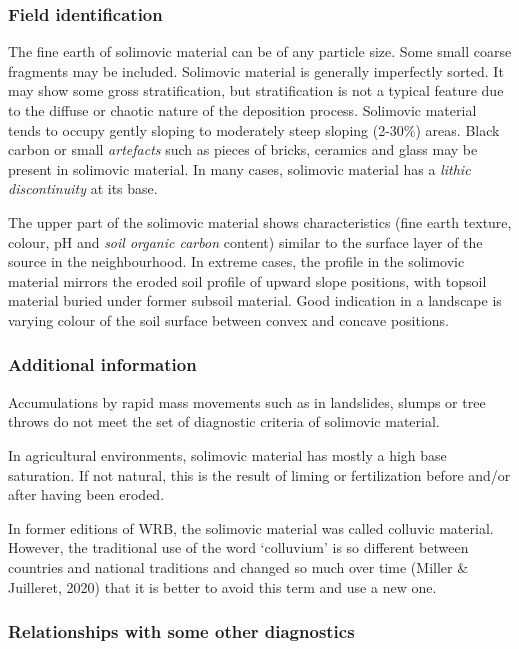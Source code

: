 \documentclass[
  letterpaper,
  DIV=11,
  numbers=noendperiod]{scrreprt}
\begin{document}
\hypertarget{field-identification-46}{%
\subsubsection{Field identification}\label{field-identification-46}}

The fine earth of solimovic material can be of any particle size. Some
small coarse fragments may be included. Solimovic material is generally
imperfectly sorted. It may show some gross stratification, but
stratification is not a typical feature due to the diffuse or chaotic
nature of the deposition process. Solimovic material tends to occupy
gently sloping to moderately steep sloping (2-30\%) areas. Black carbon
or small \emph{artefacts} such as pieces of bricks, ceramics and glass
may be present in solimovic material. In many cases, solimovic material
has a \emph{lithic discontinuity} at its base.

The upper part of the solimovic material shows characteristics (fine
earth texture, colour, pH and \emph{soil organic carbon} content)
similar to the surface layer of the source in the neighbourhood. In
extreme cases, the profile in the solimovic material mirrors the eroded
soil profile of upward slope positions, with topsoil material buried
under former subsoil material. Good indication in a landscape is varying
colour of the soil surface between convex and concave positions.

\hypertarget{additional-information-34}{%
\subsubsection{Additional information}\label{additional-information-34}}

Accumulations by rapid mass movements such as in landslides, slumps or
tree throws do not meet the set of diagnostic criteria of solimovic
material.

In agricultural environments, solimovic material has mostly a high base
saturation. If not natural, this is the result of liming or
fertilization before and/or after having been eroded.

In former editions of WRB, the solimovic material was called colluvic
material. However, the traditional use of the word `colluvium' is so
different between countries and national traditions and changed so much
over time (Miller \& Juilleret, 2020) that it is better to avoid this
term and use a new one.

\hypertarget{relationships-with-some-other-diagnostics-63}{%
\subsubsection{Relationships with some other
diagnostics}\label{relationships-with-some-other-diagnostics-63}}
\end{document}
